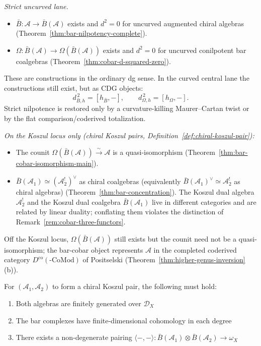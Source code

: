 \begin{remark}\label{rem:fundamental-distinction}
\emph{Strict uncurved lane.}
\begin{itemize}
\item $\bar{B}: \mathcal{A} \to \bar{B}(\mathcal{A})$ exists and
 $d^2 = 0$ for uncurved augmented chiral algebras
 (Theorem~\ref{thm:bar-nilpotency-complete}).
\item $\Omega: \bar{B}(\mathcal{A}) \to \Omega(\bar{B}(\mathcal{A}))$ exists
 and $d^2 = 0$ for uncurved conilpotent bar coalgebras
 (Theorem~\ref{thm:cobar-d-squared-zero}).
\end{itemize}

These are constructions in the ordinary dg sense. In the curved
central lane the constructions still exist, but as CDG objects:
\[
d_{\bar B,h}^{\,2}=[h_{\bar B},-],
\qquad
d_{\Omega,h}^{\,2}=[h_\Omega,-].
\]
Strict nilpotence is restored only by a curvature-killing
Maurer--Cartan twist or by the flat comparison/coderived
totalization.

\emph{On the Koszul locus only
 \textup{(}chiral Koszul pairs,
 Definition~\textup{\ref{def:chiral-koszul-pair}):}}
\begin{itemize}
\item The counit $\Omega(\bar{B}(\mathcal{A})) \xrightarrow{\sim} \mathcal{A}$
 is a quasi-isomorphism (Theorem~\ref{thm:bar-cobar-isomorphism-main}).
\item $\bar{B}(\mathcal{A}_1) \simeq (\mathcal{A}_2^!)^\vee$ as chiral
 coalgebras (equivalently
 $\bar{B}(\mathcal{A}_1)^\vee \simeq \mathcal{A}_2^!$ as chiral algebras)
 (Theorem~\ref{thm:bar-concentration}). The Koszul dual algebra
 $\mathcal{A}_2^!$ and the Koszul dual coalgebra
 $\bar{B}(\mathcal{A}_1)$ live in different categories and are related
 by linear duality; conflating them violates the distinction of
 Remark~\ref{rem:cobar-three-functors}.
\end{itemize}

Off the Koszul locus, $\Omega(\bar{B}(\mathcal{A}))$ still exists but
the counit need not be a quasi-isomorphism; the bar-cobar object
represents $\mathcal{A}$ in the completed coderived category
$D^{\mathrm{co}}(\text{-}\mathrm{CoMod})$ of Positselski
(Theorem~\ref{thm:higher-genus-inversion}(b)).
\end{remark}

\begin{theorem}\label{thm:koszul-necessary}
For $(\mathcal{A}_1, \mathcal{A}_2)$ to form a chiral Koszul pair, the following must hold:
\begin{enumerate}
\item Both algebras are finitely generated over $\mathcal{D}_X$
\item The bar complexes have finite-dimensional cohomology in each degree
\item There exists a non-degenerate pairing $\langle -, - \rangle: \bar{B}(\mathcal{A}_1) \otimes \bar{B}(\mathcal{A}_2) \to \omega_X$
\end{enumerate}
\end{theorem}

